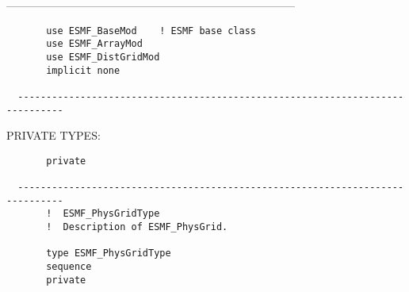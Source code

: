   ------------------------------------------------------------------------------
\begin{verbatim}       use ESMF_BaseMod    ! ESMF base class
       use ESMF_ArrayMod
       use ESMF_DistGridMod
       implicit none
 
  ------------------------------------------------------------------------------\end{verbatim}{\sf PRIVATE TYPES:}
\begin{verbatim}       private
 
  ------------------------------------------------------------------------------
       !  ESMF_PhysGridType
       !  Description of ESMF_PhysGrid.
 
       type ESMF_PhysGridType
       sequence
       private
 

\end{verbatim}
